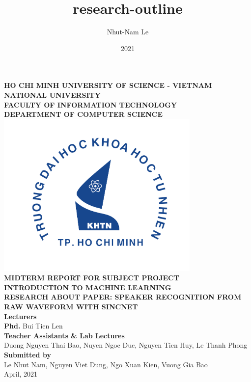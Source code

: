 \documentclass{article}
\title{research-outline}
\author{Nhut-Nam Le}
\date{2021}
\begin{document}
	\begin{titlepage}
		\begin{center}
			\large{\textbf{HO CHI MINH UNIVERSITY OF SCIENCE - VIETNAM NATIONAL UNIVERSITY\\FACULTY OF INFORMATION TECHNOLOGY\\DEPARTMENT OF COMPUTER SCIENCE}}\\
			\includegraphics[width=0.75\textwidth]{images/khtn.png}\\
			\large \textbf{MIDTERM REPORT FOR SUBJECT PROJECT}\\[0.1in]
			\huge \textbf{INTRODUCTION TO MACHINE LEARNING}\\[0.1in]
			\huge \textbf{RESEARCH ABOUT PAPER: SPEAKER RECOGNITION FROM RAW WAVEFORM WITH SINCNET}\\[0.1in]
			\vfill
			\normalsize
			\normalsize
			\textbf{Lecturers}\\
			{\textbf{Phd.} Bui Tien Len}\\[0.1in]
			\textbf{Teacher Assistants \& Lab Lectures}\\
			\vspace{0.1in}
			{Duong Nguyen Thai Bao, Nuyen Ngoc Duc, Nguyen Tien Huy, Le Thanh Phong}\\[0.1in]
			\textbf{Submitted by} \\
			\vspace{0.1in}
			{Le Nhut Nam, Nguyen Viet Dung, Ngo Xuan Kien, Vuong Gia Bao}\\[0.1in]
			\vfill
			April, 2021
		\end{center}
	\end{titlepage}
	\newpage
	
\end{document}
